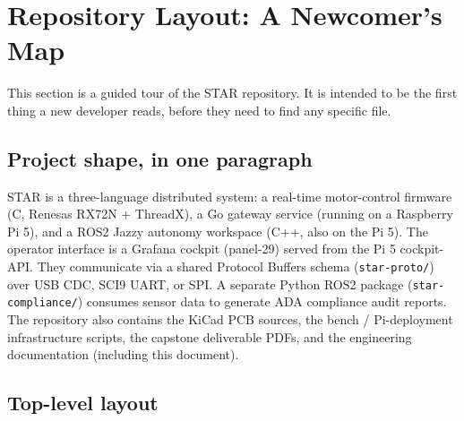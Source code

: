 
\section{Repository Layout: A Newcomer's Map}
\label{section:repository-layout}

This section is a guided tour of the STAR repository. It is intended to
be the first thing a new developer reads, before they need to find any
specific file.

\subsection{Project shape, in one paragraph}

STAR is a three-language distributed system: a real-time motor-control
firmware (C, Renesas RX72N + ThreadX), a Go gateway service (running
on a Raspberry Pi 5), and a ROS2 Jazzy autonomy workspace (C++, also
on the Pi 5). The operator interface is a Grafana cockpit (panel-29)
served from the Pi 5 cockpit-API. They communicate via a shared
Protocol Buffers schema (\texttt{star-proto/}) over USB CDC, SCI9
UART, or SPI. A separate Python ROS2 package
(\texttt{star-compliance/}) consumes sensor data to generate ADA
compliance audit reports. The repository also contains the KiCad PCB
sources, the bench / Pi-deployment infrastructure scripts, the
capstone deliverable PDFs, and the engineering documentation
(including this document).

\subsection{Top-level layout}

